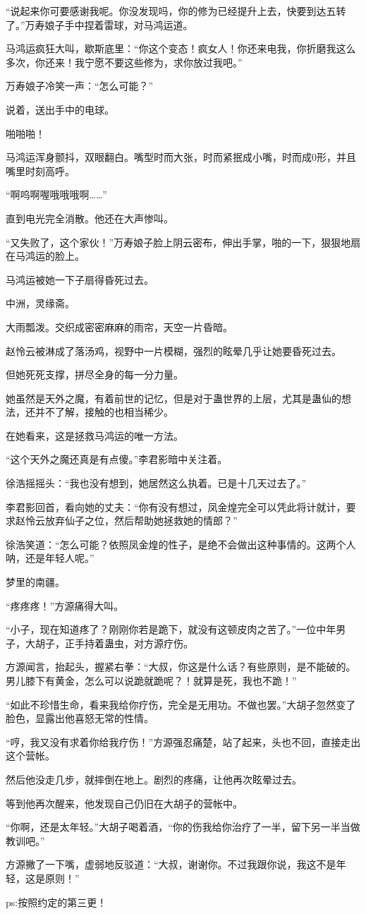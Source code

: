 \begin{this_body}
“说起来你可要感谢我呢。你没发现吗，你的修为已经提升上去，快要到达五转了。”万寿娘子手中捏着雷球，对马鸿运道。

马鸿运疯狂大叫，歇斯底里：“你这个变态！疯女人！你还来电我，你折磨我这么多次，你还来！我宁愿不要这些修为，求你放过我吧。”

万寿娘子冷笑一声：“怎么可能？”

说着，送出手中的电球。

啪啪啪！

马鸿运浑身颤抖，双眼翻白。嘴型时而大张，时而紧抿成小嘴，时而成0形，并且嘴里时刻高呼。

“啊呜啊喔哦哦哦啊……”

直到电光完全消散。他还在大声惨叫。

“又失败了，这个家伙！”万寿娘子脸上阴云密布，伸出手掌，啪的一下，狠狠地扇在马鸿运的脸上。

马鸿运被她一下子扇得昏死过去。

中洲，灵缘斋。

大雨瓢泼。交织成密密麻麻的雨帘，天空一片昏暗。

赵怜云被淋成了落汤鸡，视野中一片模糊，强烈的眩晕几乎让她要昏死过去。

但她死死支撑，拼尽全身的每一分力量。

她虽然是天外之魔，有着前世的记忆，但是对于蛊世界的上层，尤其是蛊仙的想法，还并不了解，接触的也相当稀少。

在她看来，这是拯救马鸿运的唯一方法。

“这个天外之魔还真是有点傻。”李君影暗中关注着。

徐浩摇摇头：“我也没有想到，她居然这么执着。已是十几天过去了。”

李君影回首，看向她的丈夫：“你有没有想过，凤金煌完全可以凭此将计就计，要求赵怜云放弃仙子之位，然后帮助她拯救她的情郎？”

徐浩笑道：“怎么可能？依照凤金煌的性子，是绝不会做出这种事情的。这两个人呐，还是年轻人呢。”

梦里的南疆。

“疼疼疼！”方源痛得大叫。

“小子，现在知道疼了？刚刚你若是跪下，就没有这顿皮肉之苦了。”一位中年男子，大胡子，正手持着蛊虫，对方源疗伤。

方源闻言，抬起头，握紧右拳：“大叔，你这是什么话？有些原则，是不能破的。男儿膝下有黄金，怎么可以说跪就跪呢？！就算是死，我也不跪！”

“如此不珍惜生命，看来我给你疗伤，完全是无用功。不做也罢。”大胡子忽然变了脸色，显露出他喜怒无常的性情。

“哼，我又没有求着你给我疗伤！”方源强忍痛楚，站了起来，头也不回，直接走出这个营帐。

然后他没走几步，就摔倒在地上。剧烈的疼痛，让他再次眩晕过去。

等到他再次醒来，他发现自己仍旧在大胡子的营帐中。

“你啊，还是太年轻。”大胡子喝着酒，“你的伤我给你治疗了一半，留下另一半当做教训吧。”

方源撇了一下嘴，虚弱地反驳道：“大叔，谢谢你。不过我跟你说，我这不是年轻，这是原则！”

ps:按照约定的第三更！

\end{this_body}

